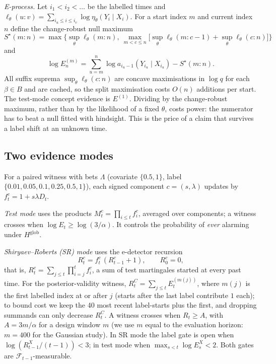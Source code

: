 \emph{E-process.} Let $i_1<i_2<\dots$ be the labelled times and $\ell_\theta(u{:}v)=\sum_{i_u\le i\le i_v}\log\eta_\theta(Y_i\mid X_i)$. For a start index $m$ and current index $n$ define the change-robust null maximum
\[
S^\star(m{:}n)=\max\Big\{\sup_{\theta}\ell_\theta(m{:}n),\ \max_{m<c\le n}\big[\sup_\theta\ell_\theta(m{:}c-1)+\sup_\theta\ell_\theta(c{:}n)\big]\Big\}
\]
and
\begin{equation}
\log E^{(m)}_n=\sum_{u=m}^{n}\log a_{i_u-1}(Y_{i_u}\mid X_{i_u})-S^\star(m{:}n).
\label{eq:ui}
\end{equation}
All suffix suprema $\sup_\theta\ell_\theta(c{:}n)$ are concave maximisations in $\log q$ for each $\beta\in B$ and are cached, so the split maximisation costs $O(n)$ additions per start. The test-mode concept evidence is $E^{(1)}$. Dividing by the change-robust maximum, rather than by the likelihood of a fixed $\theta$, costs power: the numerator has to beat a null fitted with hindsight. This is the price of a claim that survives a label shift at an unknown time.

\subsection{Two evidence modes}
\label{sec:modes}
For a paired witness with bets $\Lambda$ (covariate $\{0.5,1\}$, label $\{0.01,0.05,0.1,0.25,0.5,1\}$), each signed component $c=(s,\lambda)$ updates by $f^c_t=1+s\lambda D_t$.

\emph{Test mode} uses the products $M^c_t=\prod_{i\le t}f^c_i$, averaged over components; a witness crosses when $\log E_t\ge\log(3/\alpha)$. It controls the probability of \emph{ever} alarming under $H^{\mathrm{glob}}$.

\emph{Shiryaev--Roberts (SR) mode} uses the e-detector recursion \citep{shin2024edetectors}
\[
R^c_t=f^c_t\,(R^c_{t-1}+1),\qquad R^c_0=0,
\]
that is, $R^c_t=\sum_{j\le t}\prod_{i=j}^{t}f^c_i$, a sum of test martingales started at every past time. For the posterior-validity witness, $R^C_t=\sum_{j\le t}E^{(m(j))}_t$, where $m(j)$ is the first labelled index at or after $j$ (starts after the last label contribute $1$ each); to bound cost we keep the 40 most recent label-starts plus the first, and dropping summands can only decrease $R^C_t$. A witness crosses when $R_t\ge A$, with $A=3m/\alpha$ for a design window $m$ (we use $m$ equal to the evaluation horizon: $m=400$ for the Gaussian study). In SR mode the label gate is open when $\log(R^X_{t-1}/(t-1))<3$; in test mode when $\max_{s<t}\log E^X_s<2$. Both gates are $\mathcal F_{t-1}$-measurable.

